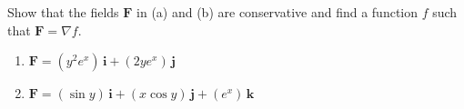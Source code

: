 \documentclass[openany]{book}
\begin{document}
\begin{prob}[12]
    Show that the fields \( \mathbf{F} \) in (a) and (b) are conservative and find a function \( f \) such that \( \mathbf{F} = \nabla f \).  

    \begin{enumerate}
        \item[(a)] \( \mathbf{F} = (y^2 e^x) \, \mathbf{i} + (2y e^x) \, \mathbf{j} \)
        \item[(b)] \( \mathbf{F} = (\sin y) \, \mathbf{i} + (x \cos y) \, \mathbf{j} + (e^x) \, \mathbf{k} \)
    \end{enumerate}
\end{prob}
\end{document}
